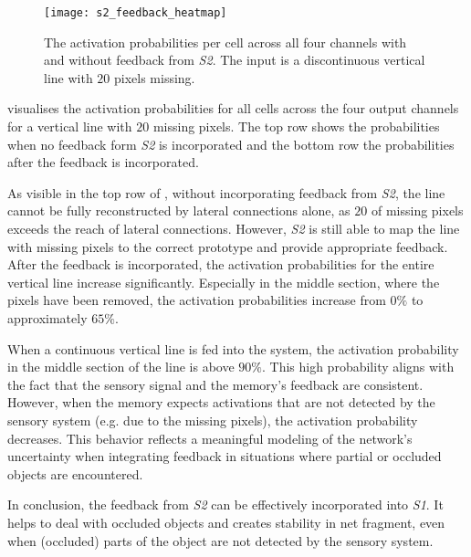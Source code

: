 \begin{figure}[h]
    \centering
    \texttt{[image: s2\_feedback\_heatmap]}
    \caption[Activation probabilities with/without \emph{S2} feedback]{The activation probabilities per cell across all four channels with and without feedback from \emph{S2}. The input is a discontinuous vertical line with $20$ pixels missing.}
\end{figure}
%
 visualises the activation probabilities for all cells across the four output channels for a vertical line with $20$ missing pixels.
The top row shows the probabilities when no feedback form \emph{S2} is incorporated and the bottom row the probabilities after the feedback is incorporated.

As visible in the top row of , without incorporating feedback from \emph{S2}, the line cannot be fully reconstructed by lateral connections alone, as $20$ of missing pixels exceeds the reach of lateral connections. However, \emph{S2} is still able to map the line with missing pixels to the correct prototype and provide appropriate feedback. After the feedback is incorporated, the activation probabilities for the entire vertical line increase significantly. Especially in the middle section, where the pixels have been removed, the activation probabilities increase from $0\%$ to approximately $65\%$.



When a continuous vertical line is fed into the system, the activation probability in the middle section of the line is above $90\%$.
This high probability aligns with the fact that the sensory signal and the memory's feedback are consistent.
However, when the memory expects activations that are not detected by the sensory system (e.g. due to the missing pixels), the activation probability decreases. This behavior reflects a meaningful modeling of the network's uncertainty when integrating feedback in situations where partial or occluded objects are encountered.

In conclusion, the feedback from \emph{S2} can be effectively incorporated into \emph{S1}.
It helps to deal with occluded objects and creates stability in net fragment, even when (occluded) parts of the object are not detected by the sensory system.



